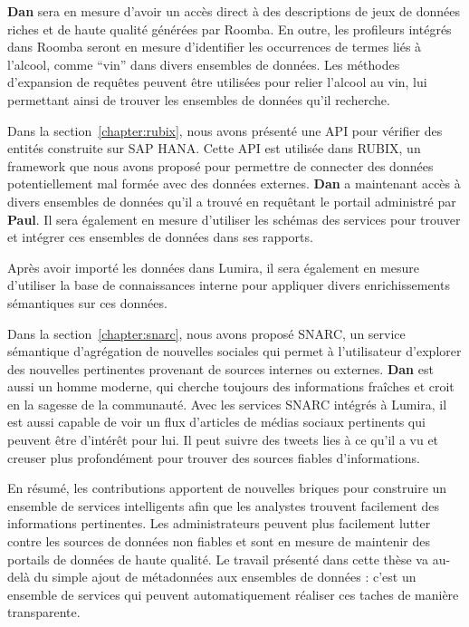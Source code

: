 \textbf{Dan} sera en mesure d'avoir un acc\`{e}s direct à des descriptions de jeux de donn\'{e}es riches et de haute qualit\'{e} g\'{e}n\'{e}r\'{e}es par Roomba. En outre, les profileurs int\'{e}gr\'{e}s dans Roomba seront en mesure d'identifier les occurrences de termes li\'{e}s à l'alcool, comme ``vin'' dans divers ensembles de donn\'{e}es. Les m\'{e}thodes d'expansion de requêtes peuvent être utilis\'{e}es pour relier l'alcool au vin, lui permettant ainsi de trouver les ensembles de donn\'{e}es qu'il recherche.

Dans la section~\ref{chapter:rubix}, nous avons pr\'{e}sent\'{e} une API pour v\'{e}rifier des entit\'{e}s construite sur SAP HANA. Cette API est utilis\'{e}e dans RUBIX, un framework que nous avons propos\'{e} pour permettre de connecter des donn\'{e}es potentiellement mal form\'{e}e avec des donn\'{e}es externes.
\textbf{Dan} a maintenant acc\`{e}s à divers ensembles de donn\'{e}es qu'il a trouv\'{e} en requêtant le portail administr\'{e} par \textbf{Paul}. Il sera \'{e}galement en mesure d'utiliser les sch\'{e}mas des services pour trouver et int\'{e}grer ces ensembles de donn\'{e}es dans ses rapports.

Apr\`{e}s avoir import\'{e} les donn\'{e}es dans Lumira, il sera \'{e}galement en mesure d'utiliser la base de connaissances interne pour appliquer divers enrichissements s\'{e}mantiques sur ces donn\'{e}es.

Dans la section~\ref{chapter:snarc}, nous avons propos\'{e} SNARC, un service s\'{e}mantique d'agr\'{e}gation de nouvelles sociales qui permet à l'utilisateur d'explorer des nouvelles pertinentes provenant de sources internes ou externes. \textbf{ Dan} est aussi un homme moderne, qui cherche toujours des informations fraîches et croit en la sagesse de la communaut\'{e}. Avec les services SNARC int\'{e}gr\'{e}s à Lumira, il est aussi capable de voir un flux d'articles de m\'{e}dias sociaux pertinents qui peuvent être d'int\'{e}rêt pour lui. Il peut suivre des tweets lies à ce qu'il a vu et creuser plus profond\'{e}ment pour trouver des sources fiables d'informations.

En r\'{e}sum\'{e}, les contributions apportent de nouvelles briques pour construire un ensemble de services intelligents afin que les analystes trouvent facilement des informations pertinentes. Les administrateurs peuvent plus facilement lutter contre les sources de donn\'{e}es non fiables et sont en mesure de maintenir des portails de donn\'{e}es de haute qualit\'{e}. Le travail pr\'{e}sent\'{e} dans cette th\`{e}se va au-delà du simple ajout de m\'{e}tadonn\'{e}es aux ensembles de donn\'{e}es : c'est un ensemble de services qui peuvent automatiquement r\'{e}aliser ces taches de mani\`{e}re transparente.

